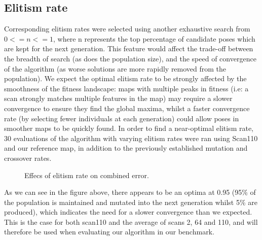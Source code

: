 \documentclass[authoryearcitations]{UoYCSproject}
\begin{document}
\subsection{Elitism rate}
\label{subsec:elite_elitism_rate}
Corresponding elitism rates were selected using another exhaustive search from $0 <= n <= 1$, where n represents the top percentage of candidate poses which are kept for the next generation. This feature would affect the trade-off between the breadth of search (as does the population size), and the speed of convergence of the algorithm (as worse solutions are more rapidly removed from the population). We expect the optimal elitism rate to be strongly affected by the smoothness of the fitness landscape: maps with multiple peaks in fitness (i.e: a scan strongly matches multiple features in the map) may require a slower convergence to ensure they find the global maxima, whilst a faster convergence rate (by selecting fewer individuals at each generation) could allow poses in smoother maps to be quickly found. In order to find a near-optimal elitism rate, 30 evaluations of the algorithm with varying elitism rates were ran using Scan110 and our reference map, in addition to the previously established mutation and crossover rates.

\begin{figure}
	\centering
	\caption{Effecs of elitism rate on combined error.}
	\label{fig:elitsm_rates}
\end{figure}
As we can see in the figure above, there appears to be an optima at 0.95 (95\% of the population is maintained and mutated into the next generation whilst 5\% are produced), which indicates the need for a slower convergence than we expected. This is the case for both scan110 and the average of scans 2, 64 and 110, and will therefore be used when evaluating our algorithm in our benchmark.
\end{document}
